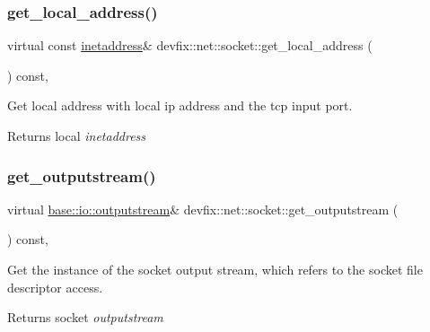 \subsubsection{\texorpdfstring{get\+\_\+local\+\_\+address()}{get\_local\_address()}}
{\footnotesize\ttfamily virtual const \hyperlink{structdevfix_1_1net_1_1inetaddress}{inetaddress}\& devfix\+::net\+::socket\+::get\+\_\+local\+\_\+address (\begin{DoxyParamCaption}{ }\end{DoxyParamCaption}) const\hspace{0.3cm}{\ttfamily [pure virtual]}, {\ttfamily [noexcept]}}



Get local address with local ip address and the tcp input port. 

\begin{DoxyReturn}{Returns}
local {\itshape inetaddress} 
\end{DoxyReturn}
\mbox{\label{structdevfix_1_1net_1_1socket_ac0320fa786f14778a3a1e2796d9dce57}} 
\subsubsection{\texorpdfstring{get\+\_\+outputstream()}{get\_outputstream()}}
{\footnotesize\ttfamily virtual \hyperlink{structdevfix_1_1base_1_1io_1_1outputstream}{base\+::io\+::outputstream}\& devfix\+::net\+::socket\+::get\+\_\+outputstream (\begin{DoxyParamCaption}{ }\end{DoxyParamCaption}) const\hspace{0.3cm}{\ttfamily [pure virtual]}, {\ttfamily [noexcept]}}



Get the instance of the socket output stream, which refers to the socket file descriptor access. 

\begin{DoxyReturn}{Returns}
socket {\itshape outputstream} 
\end{DoxyReturn}
\mbox{\label{structdevfix_1_1net_1_1socket_afb69dcc8da66eb15a927d031f50a4ba2}} 
